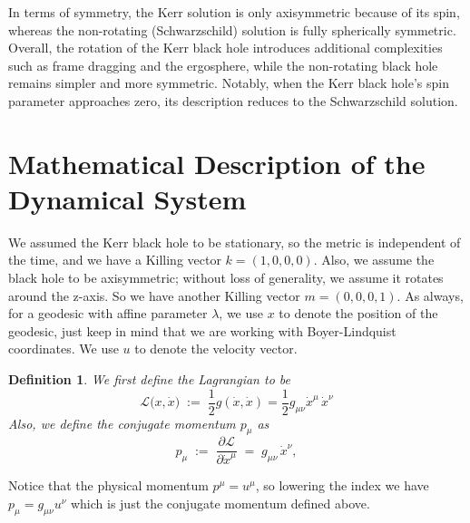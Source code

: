 \documentclass{article}
\newtheorem{definition}{Definition}[section]
\theoremstyle{remark}
\begin{document}
In terms of symmetry, the Kerr solution is only axisymmetric because of its spin, whereas the non-rotating (Schwarzschild) solution is fully spherically symmetric. Overall, the rotation of the Kerr black hole introduces additional complexities such as frame dragging and the ergosphere, while the non-rotating black hole remains simpler and more symmetric. Notably, when the Kerr black hole’s spin parameter approaches zero, its description reduces to the Schwarzschild solution.

\section{Mathematical Description of the Dynamical System}


We assumed the Kerr black hole to be stationary, so the metric is independent of the time, and we have a Killing vector $k=(1,0,0,0)$. Also, we assume the black hole to be axisymmetric; without loss of generality, we assume it rotates around the z-axis. So we have another Killing vector $m=(0,0,0,1)$.
As always, for a geodesic with affine parameter $\lambda$, we use $x$ to denote the position of the geodesic, just keep in mind that we are working with Boyer-Lindquist coordinates. We use $u$ to denote the velocity vector.

\begin{definition}
    We first define the \textit{Lagrangian} to be 
    \begin{equation}
        \mathcal{L}\bigl(x, \dot{x}\bigr) \;:=\; \frac{1}{2}g(\dot{x},\dot{x})
=\frac{1}{2}g_{\mu\nu}\dot{x}^\mu\,\dot{x}^\nu
    \end{equation}
Also, we define the \textit{conjugate momentum} $p_\mu$ as
\begin{equation}
p_\mu \;:=\; \frac{\partial \mathcal{L}}{\partial \dot{x}^\mu}
\;=\; g_{\mu\nu}\,\dot{x}^\nu,
\end{equation}
\end{definition}

Notice that the physical momentum $p^{\mu}=u^{\mu}$, so lowering the index we have $p_{\mu}=g_{\mu\nu}u^{\nu}$ which is just the conjugate momentum defined above.
\end{document}
